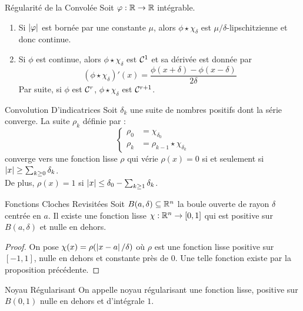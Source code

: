 \documentclass{cours}
\begin{document}
\begin{lemme}{Régularité de la Convolée}{}
    Soit $\varphi : \mathbb{R} \to \mathbb{R}$ intégrable.
    \begin{enumerate}
        \item Si $\left|\varphi\right|$ est bornée par une constante $\mu$, alors $\phi \star \chi_{\delta}$ est $\mu/\delta$-lipschitzienne et donc continue.
        \item Si $\phi$ est continue, alors $\phi \star \chi_{\delta}$ est $\mathcal{C}^{1}$ et sa dérivée est donnée par 
        \[
            \left(\phi \star \chi_{\delta}\right)'(x) = \frac{\phi(x + \delta) - \phi(x - \delta)}{2 \delta}
        \]
        Par suite, si $\phi$ est $\mathcal{C}^{r}$, $\phi \star \chi_{\delta}$ est $\mathcal{C}^{r + 1}$.
    \end{enumerate}
\end{lemme}

\begin{propositionfr}{Convolution D'indicatrices}{}
    Soit $\delta_{k}$ une suite de nombres positifs dont la série converge. La suite $\rho_{k}$ définie par :
    \[
        \begin{cases}
            \rho_{0} & = \chi_{\delta_{0}}\\
            \rho_{k} & = \rho_{k - 1} \star \chi_{\delta_{k}}
        \end{cases}
    \]
    converge vers une fonction lisse $\rho$ qui vérie $\rho(x) = 0$ si et seulement si $\left|x\right| \geq \sum_{k \geq 0}\delta_{k}$.\\
    De plus, $\rho(x) = 1$ si $\left|x\right| \leq \delta_{0} - \sum_{k \geq 1}\delta_{k}$.
\end{propositionfr}

\begin{corollaire}{Fonctions Cloches Revisitées}{}
    Soit $B(a, \delta) \subseteq \mathbb{R}^{n}$ la boule ouverte de rayon $\delta$ centrée en $a$. Il existe une fonction lisse $\chi: \mathbb{R}^{n} \to [0, 1]$ qui est positive sur $B(a ,\delta)$ et nulle en dehors.
\end{corollaire}
\begin{proof}
    On pose $\chi(x) = \rho(\left|x - a\right| / \delta)$ où $\rho$ est une fonction lisse positive sur $\left[-1, 1\right]$, nulle en dehors et constante près de $0$. Une telle fonction existe par la proposition précédente. 
\end{proof}

\begin{définition}{Noyau Régularisant}{}
    On appelle noyau régularisant une fonction lisse, positive sur $B(0, 1)$ nulle en dehors et d'intégrale $1$. 
\end{définition}
\end{document}
